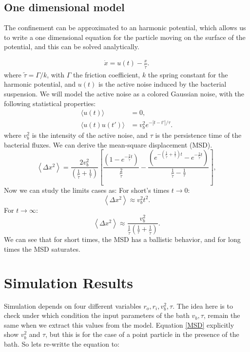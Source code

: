 \documentclass[%
10pt,
superscriptaddress,
twocolumn,
 amsmath,amssymb,
 aps,prx,
]{revtex4-2}
\begin{document}
\subsection{One dimensional model}
The confinement can be approximated to an harmonic potential, which allows us to write a one dimensional equation for the particle moving on the surface of the potential, and this can be solved analytically. 

\begin{align}
    \label{eq.Langevin}
    \dot{x}=u(t)-\frac{x}{\tilde{\tau}}.
\end{align}
%
where $\tilde{\tau}=\Gamma/k$, with $\Gamma$ the friction coefficient, $k$ the spring constant for the harmonic potential, and $u(t)$ is the active noise induced by the bacterial suspension.
We will model the active noise as a colored Gaussian noise, with the following statistical properties:
%
\begin{align}
    \label{eq.act.noise}
    \langle u(t)\rangle &=0,\\
    \langle u(t)u(t')\rangle &=v_b^2e^{-|t-t'|/\tau}.
\end{align}
%
where $v_b^2$ is the intensity of the active noise, and $\tau$ is the persistence time of the bacterial fluxes. 
We can derive the mean-square displacement (MSD).
\begin{equation}
	\label{MSD}
	\left<\Delta x^2\right>=\frac{2v_b^2}{(\frac{1}{\tilde{\tau}}+\frac{1}{\tau})}\left[\frac{(1-e^{-\frac{2}{\tilde{\tau}} t})}{\frac{2}{\tilde{\tau}}}-\frac{(e^{-(\frac{1}{\tilde{\tau}}+\frac{1}{\tau})t}-e^{-\frac{2}{\tilde{\tau}} t})}{\frac{1}{\tilde{\tau}}-\frac{1}{\tau}}\right],
\end{equation}
Now we can study the limits cases as:
For short's times $t \to 0$:
\begin{equation}
	\label{tcortos}
	\left<\Delta x^2\right>\approx v_b^2 t^2.
\end{equation}
For $t \to \infty$:
\begin{equation}
	\label{tlargos}
	\left<\Delta x^2\right>\approx \frac{v_b^2}{\frac{1}{\tilde{\tau}}(\frac{1}{\tau}+\frac{1}{\tilde{\tau}})}.
\end{equation}
We can see that for short times, the MSD has a ballistic behavior, and for long times the MSD saturates.
\section{Simulation Results}

Simulation depends on four different variables $r_o,r_i,v_b^2,\tau$. 
The idea here is to check under which condition the input parameters of the bath $v_b, \tau$, remain the same when we extract this values from the model. Equation \ref*{MSD} explicitly show $v_b^2$ and $\tau$, but this is for the case of a point particle in the presence of the bath. So lets re-writte the equation to:
\end{document}
